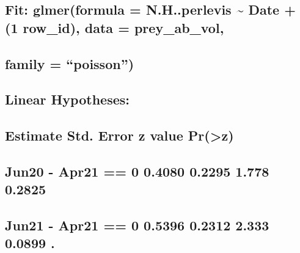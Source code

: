 \documentclass[
]{article}
\begin{document}
\hypertarget{section-10}{%
\subsection{}\label{section-10}}

\hypertarget{fit-glmerformula-n.h..perlevis-date-1-row_id-data-prey_ab_vol}{%
\subsection{Fit: glmer(formula = N.H..perlevis \textasciitilde{} Date +
(1 \textbar{} row\_id), data =
prey\_ab\_vol,}\label{fit-glmerformula-n.h..perlevis-date-1-row_id-data-prey_ab_vol}}

\hypertarget{family-poisson}{%
\subsection{family = ``poisson'')}\label{family-poisson}}

\hypertarget{section-11}{%
\subsection{}\label{section-11}}

\hypertarget{linear-hypotheses}{%
\subsection{Linear Hypotheses:}\label{linear-hypotheses}}

\hypertarget{estimate-std.-error-z-value-prz}{%
\subsection{Estimate Std. Error z value
Pr(\textgreater\textbar z\textbar)}\label{estimate-std.-error-z-value-prz}}

\hypertarget{jun20---apr21-0-0.4080-0.2295-1.778-0.2825}{%
\subsection{Jun20 - Apr21 == 0 0.4080 0.2295 1.778
0.2825}\label{jun20---apr21-0-0.4080-0.2295-1.778-0.2825}}

\hypertarget{jun21---apr21-0-0.5396-0.2312-2.333-0.0899-.}{%
\subsection{Jun21 - Apr21 == 0 0.5396 0.2312 2.333 0.0899
.}\label{jun21---apr21-0-0.5396-0.2312-2.333-0.0899-.}}
\end{document}
